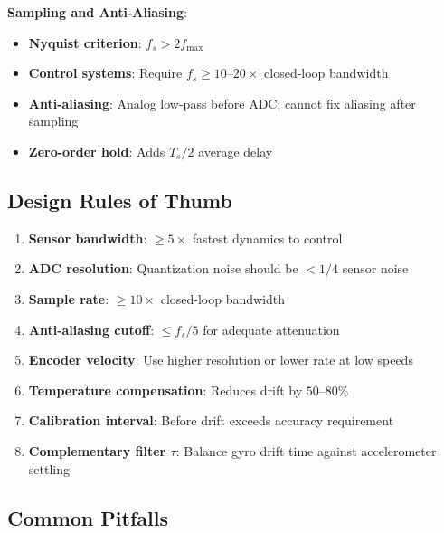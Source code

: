 \textbf{Sampling and Anti-Aliasing}:
\begin{itemize}
    \item \textbf{Nyquist criterion}: $f_s > 2 f_{\max}$
    \item \textbf{Control systems}: Require $f_s \geq 10$--$20 \times$ closed-loop bandwidth
    \item \textbf{Anti-aliasing}: Analog low-pass before ADC; cannot fix aliasing after sampling
    \item \textbf{Zero-order hold}: Adds $T_s/2$ average delay
\end{itemize}

\subsection{Design Rules of Thumb}

\begin{enumerate}
    \item \textbf{Sensor bandwidth}: $\geq 5\times$ fastest dynamics to control
    \item \textbf{ADC resolution}: Quantization noise should be $<1/4$ sensor noise
    \item \textbf{Sample rate}: $\geq 10\times$ closed-loop bandwidth
    \item \textbf{Anti-aliasing cutoff}: $\leq f_s/5$ for adequate attenuation
    \item \textbf{Encoder velocity}: Use higher resolution or lower rate at low speeds
    \item \textbf{Temperature compensation}: Reduces drift by $50$--$80\%$
    \item \textbf{Calibration interval}: Before drift exceeds accuracy requirement
    \item \textbf{Complementary filter $\tau$}: Balance gyro drift time against accelerometer settling
\end{enumerate}

\subsection{Common Pitfalls}

